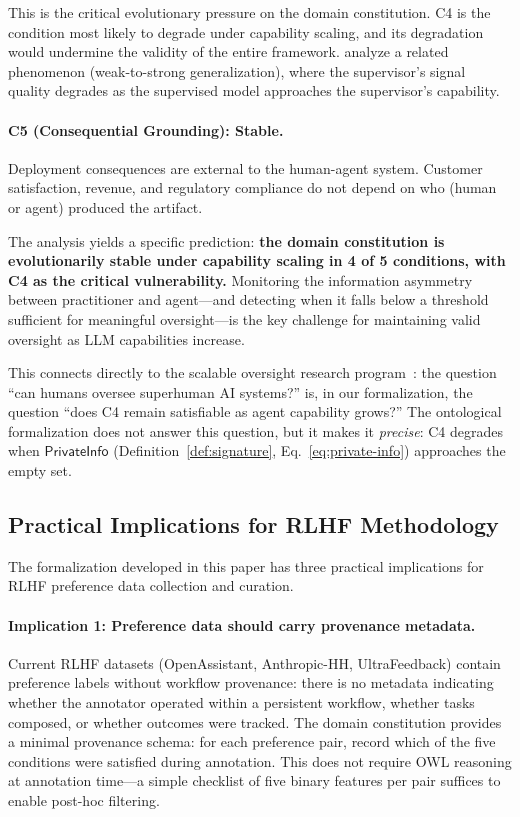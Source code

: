 \documentclass[11pt]{article}
\begin{document}
This is the critical evolutionary pressure on the domain constitution.
C4 is the condition most likely to degrade under capability scaling, and its degradation would undermine the validity of the entire framework.
\citet{burns2023weak} analyze a related phenomenon (weak-to-strong generalization), where the supervisor's signal quality degrades as the supervised model approaches the supervisor's capability.

\paragraph{C5 (Consequential Grounding): Stable.}
Deployment consequences are external to the human-agent system.
Customer satisfaction, revenue, and regulatory compliance do not depend on who (human or agent) produced the artifact.

The analysis yields a specific prediction: \textbf{the domain constitution is evolutionarily stable under capability scaling in 4 of 5 conditions, with C4 as the critical vulnerability.}
Monitoring the information asymmetry between practitioner and agent---and detecting when it falls below a threshold sufficient for meaningful oversight---is the key challenge for maintaining valid oversight as LLM capabilities increase.

This connects directly to the scalable oversight research program~\citep{bowman2022measuring}: the question ``can humans oversee superhuman AI systems?'' is, in our formalization, the question ``does C4 remain satisfiable as agent capability grows?''
The ontological formalization does not answer this question, but it makes it \emph{precise}: C4 degrades when $\mathsf{PrivateInfo}$ (Definition~\ref{def:signature}, Eq.~\ref{eq:private-info}) approaches the empty set.

\subsection{Practical Implications for RLHF Methodology}
\label{sec:disc-practical}

The formalization developed in this paper has three practical implications for RLHF preference data collection and curation.

\paragraph{Implication 1: Preference data should carry provenance metadata.}
Current RLHF datasets (OpenAssistant, Anthropic-HH, UltraFeedback) contain preference labels without workflow provenance: there is no metadata indicating whether the annotator operated within a persistent workflow, whether tasks composed, or whether outcomes were tracked.
The domain constitution provides a minimal provenance schema: for each preference pair, record which of the five conditions were satisfied during annotation.
This does not require OWL reasoning at annotation time---a simple checklist of five binary features per pair suffices to enable post-hoc filtering.
\end{document}
